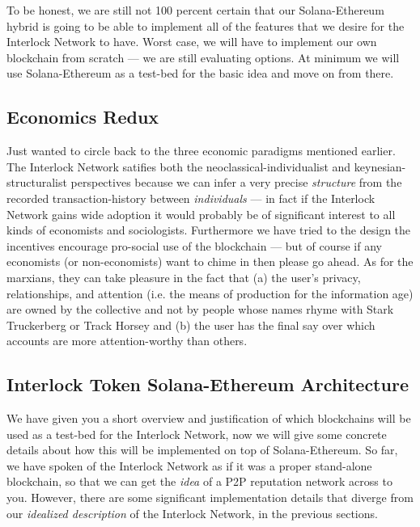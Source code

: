 \documentclass[a4paper]{article}
\begin{document}
To be honest, we are still not 100 percent certain that our Solana-Ethereum hybrid is going to be able to implement all of the features that we desire for the Interlock Network to have. Worst case, we will have to implement our own blockchain from scratch ---  we are still evaluating options. At minimum we will use Solana-Ethereum as a test-bed for the basic idea and move on from there.
\subsection{Economics Redux}
\label{Economics Redux}

Just wanted to circle back to the three economic paradigms mentioned earlier. The Interlock Network satifies both the neoclassical-individualist and keynesian-structuralist perspectives because we can infer a very precise \emph{structure} from the recorded transaction-history between \emph{individuals} ---  in fact if the Interlock Network gains wide adoption it would probably be of significant interest to all kinds of economists and sociologists. Furthermore we have tried to the design the incentives encourage pro-social use of the blockchain ---  but of course if any economists (or non-economists) want to chime in then please go ahead. As for the marxians, they can take pleasure in the fact that (a) the user's privacy, relationships, and attention (i.e. the means of production for the information age) are owned by the collective and not by people whose names rhyme with Stark Truckerberg or Track Horsey and (b) the user has the final say over which accounts are more attention-worthy than others.
\subsection{Interlock Token Solana-Ethereum Architecture}
\label{Interlock Token Solana-Ethereum Architecture}

We have given you a short overview and justification of which blockchains will be used as a test-bed for the Interlock Network, now we will give some concrete details about how this will be implemented on top of Solana-Ethereum. So far, we have spoken of the Interlock Network as if it was a proper stand-alone blockchain, so that we can get the \emph{idea} of a P2P reputation network across to you. However, there are some significant implementation details that diverge from our \emph{idealized description} of the Interlock Network, in the previous sections.
\end{document}
